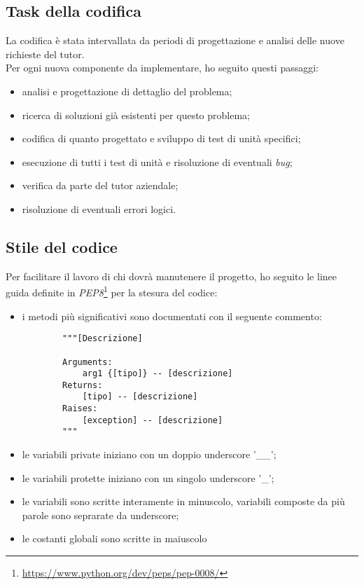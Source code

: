\subsection{Task della codifica}
La codifica è stata intervallata da periodi di progettazione e analisi delle nuove richieste del tutor.\\
Per ogni nuova componente da implementare, ho seguito questi passaggi:
\begin{itemize}
    \item analisi e progettazione di dettaglio del problema;
    \item ricerca di soluzioni già esistenti per questo problema;
    \item codifica di quanto progettato e sviluppo di test di unità specifici;
    \item esecuzione di tutti i test di unità e risoluzione di eventuali \textit{bug};
    \item verifica da parte del tutor aziendale;
    \item risoluzione di eventuali errori logici.
\end{itemize}

\subsection{Stile del codice}
Per facilitare il lavoro di chi dovrà manutenere il progetto, ho seguito le linee guida definite in \textit{PEP8}\footnote{\url{https://www.python.org/dev/peps/pep-0008/}} per la stesura del codice:
\begin{itemize}
    \item i metodi più significativi sono documentati con il seguente commento:
    \begin{lstlisting}
        """[Descrizione]

        Arguments:
            arg1 {[tipo]} -- [descrizione]
        Returns:
            [tipo] -- [descrizione]
        Raises:
            [exception] -- [descrizione]
        """
    \end{lstlisting}
    \item le variabili private iniziano con un doppio underscore '\_\_';
    \item le variabili protette iniziano con un singolo underscore '\_';
    \item le variabili sono scritte interamente in minuscolo, variabili composte da più parole sono seprarate da underscore;
    \item le costanti globali sono scritte in maiuscolo
\end{itemize}

